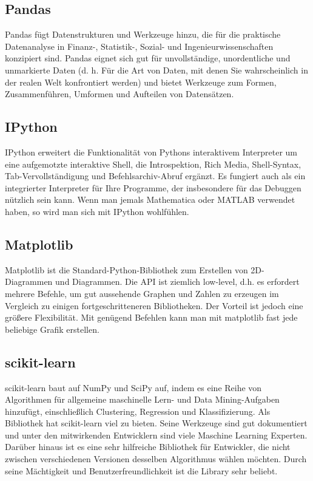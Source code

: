 \subsection{Pandas}

Pandas fügt Datenstrukturen und Werkzeuge hinzu, die für die praktische Datenanalyse in Finanz-, Statistik-, Sozial- und Ingenieurwissenschaften konzipiert sind. Pandas eignet sich gut für unvollständige, unordentliche und unmarkierte Daten (d. h. Für die Art von Daten, mit denen Sie wahrscheinlich in der realen Welt konfrontiert werden) und bietet Werkzeuge zum Formen, Zusammenführen, Umformen und Aufteilen von Datensätzen.

\subsection{IPython}

IPython erweitert die Funktionalität von Pythons interaktivem Interpreter um eine aufgemotzte interaktive Shell, die Introspektion, Rich Media, Shell-Syntax, Tab-Vervollständigung und Befehlsarchiv-Abruf ergänzt. Es fungiert auch als ein integrierter Interpreter für Ihre Programme, der insbesondere für das Debuggen nützlich sein kann. Wenn man jemals Mathematica oder MATLAB verwendet haben, so wird man sich mit IPython wohlfühlen.

\subsection{Matplotlib}

Matplotlib ist die Standard-Python-Bibliothek zum Erstellen von 2D-Diagrammen und Diagrammen. Die API ist ziemlich low-level, d.h. es erfordert mehrere Befehle, um gut aussehende Graphen und Zahlen zu erzeugen im Vergleich zu einigen   fortgeschritteneren Bibliotheken. Der Vorteil ist jedoch eine größere Flexibilität. Mit genügend Befehlen kann man mit matplotlib fast jede beliebige Grafik erstellen.




\subsection{scikit-learn}

scikit-learn baut auf NumPy und SciPy auf, indem es eine Reihe von Algorithmen für allgemeine maschinelle Lern- und Data Mining-Aufgaben hinzufügt, einschließlich Clustering, Regression und Klassifizierung. Als Bibliothek hat scikit-learn viel zu bieten. Seine Werkzeuge sind gut dokumentiert und unter den mitwirkenden Entwicklern sind viele Maschine Learning Experten. Darüber hinaus ist es eine sehr hilfreiche Bibliothek für Entwickler, die nicht zwischen verschiedenen Versionen desselben Algorithmus wählen möchten. Durch seine Mächtigkeit und Benutzerfreundlichkeit ist die Library sehr beliebt.



